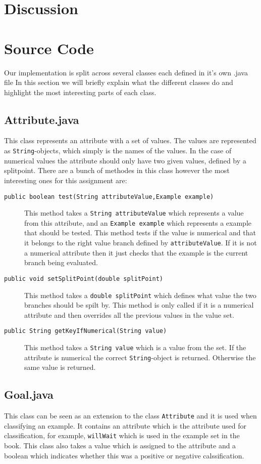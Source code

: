 \documentclass[a4paper]{article}
\begin{document}
\section{Discussion}

\section{Source Code}
Our implementation is split across several classes each defined in it's own .java file In this section we will briefly explain what the different classes do and highlight the most interesting parts of each class.

\subsection{Attribute.java}
This class represents an attribute with a set of values. The values are represented as \texttt{String}-objects, which simply is the names of the values. In the case of numerical values the attribute should only have two given values, defined by a splitpoint. There are a bunch of methodes in this class however the most interesting ones for this assignment are:
\begin{description}
\item[\texttt{public boolean test(String attributeValue,Example example)}] This method takes a \texttt{String attributeValue} which represents a value from this attribute, and an \texttt{Example example} which represents a example that should be tested. 
This method tests if the value is numerical and that it belongs to the right value branch defined by \texttt{attributeValue}. If it is not a numerical attribute then it just checks that the example is the current branch being evaluated.
\item[\texttt{public void setSplitPoint(double splitPoint)}] This method takes a \texttt{double splitPoint} which defines what value the two branches should be spilt by. This method is only called if it is a numerical attribute and then overrides all the previous values in the value set.
\item[\texttt{public String getKeyIfNumerical(String value)}] This method takes a \texttt{String value} which is a value from the set. If the attribute is numerical the correct \texttt{String}-object is returned. Otherwise the same value is returned. 
\end{description} 
\subsection{Goal.java}
This class can be seen as an extension to the class \texttt{Attribute} and it is used when classifying an example. It contains an attribute which is the attribute used for classification, for example, \texttt{willWait} which is used in the example set in the book. This class also takes a value which is assigned to the attribute and a boolean which indicates whether this was a positive or negative calssification.
\end{document}
